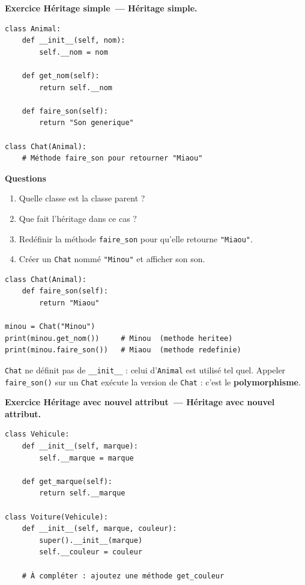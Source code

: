 \documentclass[11pt,a4paper]{article}
\newif\ifcorrige
\newcommand{\py}[1]{\texttt{#1}}
\newcounter{exo}[section]
\renewcommand{\theexo}{\arabic{exo}}
\newcommand{\exo}[2][]{%
  \Needspace{5cm}\stepcounter{exo}%
  \begin{quest}\textbf{Exercice \theexo\ifx\relax#1\relax\else\ — #1\fi.}
  \ifx\relax#2\relax\else\ #2\fi\end{quest}}
\newcommand{\rep}[1]{%
  \ifcorrige
    \par\smallskip{\color{corr}\small#1}\par\smallskip
  \else
    \par\nobreak\vspace{1mm}\noindent\color{black!55}\dotfill\par
    \noindent\color{black!55}\dotfill\par\color{black}\vspace{1mm}
  \fi}
\newcommand{\zonecode}[1][4cm]{%
  \ifcorrige\else
    \par\smallskip\noindent
    \begin{tcolorbox}[colback=white,colframe=black!45,boxrule=0.5pt,arc=1pt,height=#1]\end{tcolorbox}%
  \fi}
\newenvironment{solution}
  {\ifcorrige
     \begin{tcolorbox}[enhanced,breakable,colback=corrbg,colframe=corr,boxrule=0.6pt,arc=1pt,
       left=5pt,right=5pt,top=4pt,bottom=4pt,
       title={Corrigé},coltitle=corr,fonttitle=\bfseries\small,detach title,
       before upper={\tcbtitle\par\smallskip},fontupper=\small]%
   \else
     \setbox0\vbox\bgroup
   \fi}
  {\ifcorrige\end{tcolorbox}\else\egroup\fi}
\begin{document}
\exo[Héritage simple]{}

\begin{lstlisting}
class Animal:
    def __init__(self, nom):
        self.__nom = nom

    def get_nom(self):
        return self.__nom

    def faire_son(self):
        return "Son generique"

class Chat(Animal):
    # Méthode faire_son pour retourner "Miaou"
\end{lstlisting}

\textbf{Questions}
\begin{enumerate}
  \item Quelle classe est la classe parent ?
    \rep{\py{Animal}. \py{Chat} est la classe fille (ou classe dérivée).}
  \item Que fait l'héritage dans ce cas ?
    \rep{\py{Chat} récupère sans les réécrire le constructeur \py{__init__}, l'attribut privé
    \py{__nom} et la méthode \py{get_nom} d'\py{Animal}. Elle peut en plus redéfinir
    \py{faire_son} pour lui donner son comportement propre.}
  \item Redéfinir la méthode \py{faire_son} pour qu'elle retourne \py{"Miaou"}.
  \item Créer un \py{Chat} nommé \py{"Minou"} et afficher son son.
\end{enumerate}
\zonecode[4.5cm]
\begin{solution}
\begin{lstlisting}
class Chat(Animal):
    def faire_son(self):
        return "Miaou"

minou = Chat("Minou")
print(minou.get_nom())     # Minou  (methode heritee)
print(minou.faire_son())   # Miaou  (methode redefinie)
\end{lstlisting}
\py{Chat} ne définit pas de \py{__init__} : celui d'\py{Animal} est utilisé tel quel.
Appeler \py{faire_son()} sur un \py{Chat} exécute la version de \py{Chat} : c'est le
\textbf{polymorphisme}.
\end{solution}

\exo[Héritage avec nouvel attribut]{}

\begin{lstlisting}
class Vehicule:
    def __init__(self, marque):
        self.__marque = marque

    def get_marque(self):
        return self.__marque

class Voiture(Vehicule):
    def __init__(self, marque, couleur):
        super().__init__(marque)
        self.__couleur = couleur

    # À compléter : ajoutez une méthode get_couleur
\end{lstlisting}
\end{document}
